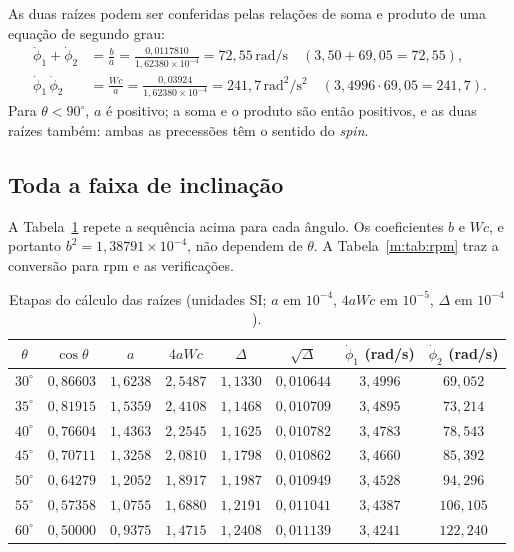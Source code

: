 \documentclass[11pt,a4paper]{article}
\newcommand{\un}[1]{\,\mathrm{#1}}
\newcommand{\phid}{\dot{\phi}}
\begin{document}
As duas raízes podem ser conferidas pelas relações de soma e produto de uma equação de segundo grau:
\begin{align}
\phid_1+\phid_2&=\frac{b}{a}=\frac{0,0117810}{1,62380\times10^{-4}}=72,55\un{rad/s}\quad(3,50+69,05=72,55),\\
\phid_1\,\phid_2&=\frac{Wc}{a}=\frac{0,03924}{1,62380\times10^{-4}}=241,7\un{rad^2/s^2}\quad(3,4996\cdot69,05=241,7).
\end{align}
Para $\theta<90^\circ$, $a$ é positivo; a soma e o produto são então positivos, e as duas raízes também: ambas as precessões têm o sentido do \textit{spin}.

\subsection{Toda a faixa de inclinação}

A Tabela~\ref{m:tab:a} repete a sequência acima para cada ângulo. Os coeficientes $b$ e $Wc$, e portanto $b^2=1,38791\times10^{-4}$, não dependem de $\theta$. A Tabela~\ref{m:tab:rpm} traz a conversão para rpm e as verificações.

\begin{table}[H]
\centering\small
\caption{Etapas do cálculo das raízes (unidades SI; $a$ em $10^{-4}$, $4aWc$ em $10^{-5}$, $\Delta$ em $10^{-4}$).}
\label{m:tab:a}
\begin{tabular}{cccccccc}
\toprule
$\theta$ & $\cos\theta$ & $a$ & $4aWc$ & $\Delta$ & $\sqrt{\Delta}$ & $\phid_1$ (rad/s) & $\phid_2$ (rad/s)\\
\midrule
$30^\circ$ & $0,86603$ & $1,6238$ & $2,5487$ & $1,1330$ & $0,010644$ & $3,4996$ & $69,052$\\
$35^\circ$ & $0,81915$ & $1,5359$ & $2,4108$ & $1,1468$ & $0,010709$ & $3,4895$ & $73,214$\\
$40^\circ$ & $0,76604$ & $1,4363$ & $2,2545$ & $1,1625$ & $0,010782$ & $3,4783$ & $78,543$\\
$45^\circ$ & $0,70711$ & $1,3258$ & $2,0810$ & $1,1798$ & $0,010862$ & $3,4660$ & $85,392$\\
$50^\circ$ & $0,64279$ & $1,2052$ & $1,8917$ & $1,1987$ & $0,010949$ & $3,4528$ & $94,296$\\
$55^\circ$ & $0,57358$ & $1,0755$ & $1,6880$ & $1,2191$ & $0,011041$ & $3,4387$ & $106,105$\\
$60^\circ$ & $0,50000$ & $0,9375$ & $1,4715$ & $1,2408$ & $0,011139$ & $3,4241$ & $122,240$\\
\bottomrule
\end{tabular}
\end{table}
\end{document}
